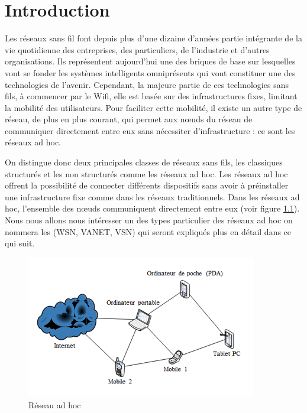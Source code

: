 
\chapter{Introduction}\label{intro}

Les réseaux sans fil font depuis plus d'une dizaine d'années partie intégrante de la vie quotidienne des entreprises, des particuliers, de l'industrie et d'autres organisations. Ils
représentent aujourd'hui une des briques de base sur lesquelles vont se fonder les systèmes
intelligents omniprésents qui vont constituer une des technologies de l'avenir. Cependant, la majeure partie de ces technologies sans fils, à commencer par le Wifi, elle est basée  sur des infrastructures fixes, limitant la mobilité des utilisateurs. Pour faciliter cette mobilité, il existe  un autre type de réseau, de plus en plus courant, qui  permet aux nœuds du réseau de communiquer directement entre eux sans nécessiter d’infrastructure : ce sont les réseaux ad hoc.

On distingue donc deux principales classes de réseaux sans fils, les classiques structurés et les non structurés comme les réseaux ad hoc. Les réseaux ad hoc offrent la possibilité de connecter différents dispositifs sans avoir à préinstaller une infrastructure fixe comme dans les réseaux traditionnels. Dans les réseaux ad hoc, l’ensemble des nœuds communiquent directement entre eux (voir figure \ref{reseauAdHoc}). Nous nous allons nous intéresser un des types particulier des réseaux ad hoc on nommera les (WSN, VANET, VSN) qui seront expliqués plus en détail dans ce qui suit.

\begin{figure}[h]
\centering
\includegraphics[scale=0.8]{intro/reseauAdHoc.png}
\caption{\label{reseauAdHoc} Réseau ad hoc}
\end{figure}


